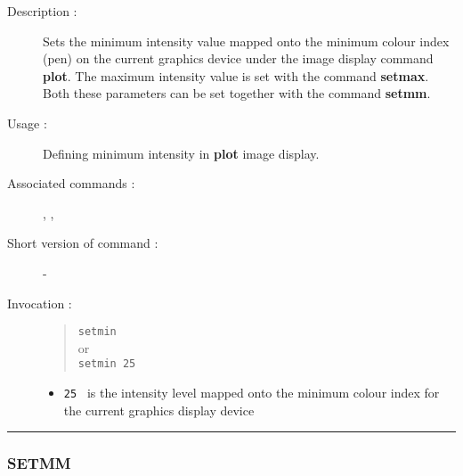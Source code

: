 \begin{description}

\item[Description :] Sets the minimum intensity value mapped onto the
minimum colour index (pen) on the current graphics device under the
image display command {\bf plot}.  The maximum intensity value is set with
the command {\bf setmax}.  Both these parameters can be set together with the
command {\bf setmm}.

\item[Usage :] Defining minimum intensity in {\bf plot} image display.

\item[Associated commands :] {\tt {}},
{\tt {}}, {\tt {}}

\item[Short version of command :] -
\item[Invocation :]

\begin{quote}{\tt  setmin }\\
or \\
{\tt setmin 25 }
\end{quote}

\begin{itemize}

\item {\tt 25 } is the intensity level mapped onto the minimum colour
 index for the current graphics display device
\end{itemize}

\end{description}

\hrule
\subsubsection*{\label{SETMM}SETMM}

